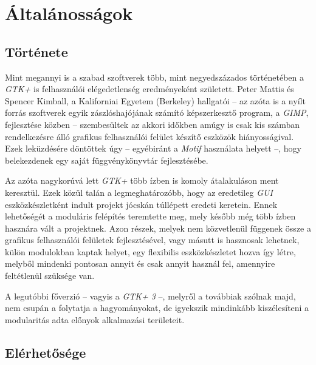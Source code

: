 \section{Általánosságok}

\subsection{Története}

Mint megannyi is a szabad szoftverek több, mint negyedszázados történetében a \textit{GTK+} is felhasználói elégedetlenség eredményeként született. Peter Mattis és Spencer Kimball, a Kaliforniai Egyetem (Berkeley) hallgatói -- az azóta is a nyílt forrás szoftverek egyik zászlóshajójának számító képszerkesztő program, a \textit{GIMP}, fejlesztése közben -- szembesültek az akkori időkben amúgy is csak kis számban rendelkezésre álló grafikus felhasználói felület készítő eszközök hiányosságival. Ezek leküzdésére döntöttek úgy -- egyébiránt a \textit{Motif} használata helyett --, hogy belekezdenek egy saját függvénykönyvtár fejlesztésébe.

Az azóta nagykorúvá lett \textit{GTK+} több ízben is komoly átalakuláson ment keresztül. Ezek közül talán a legmeghatározóbb, hogy az eredetileg \textit{GUI} eszközkészletként indult projekt jócskán túllépett eredeti keretein. Ennek lehetőségét a moduláris felépítés teremtette meg, mely később még több ízben hasznára vált a projektnek. Azon részek, melyek nem közvetlenül függenek össze a grafikus felhasználói felületek fejlesztésével, vagy másutt is hasznosak lehetnek, külön modulokban kaptak helyet, egy flexibilis eszközkészletet hozva így létre, melyből mindenki pontosan annyit és csak annyit használ fel, amennyire feltétlenül szüksége van.

A legutóbbi főverzió -- vagyis a \textit{GTK+ 3} --, melyről a továbbiak szólnak majd, nem csupán a folytatja a hagyományokat, de igyekszik mindinkább kiszélesíteni a modularitás adta előnyok alkalmazási területeit.

\subsection{Elérhetősége}

